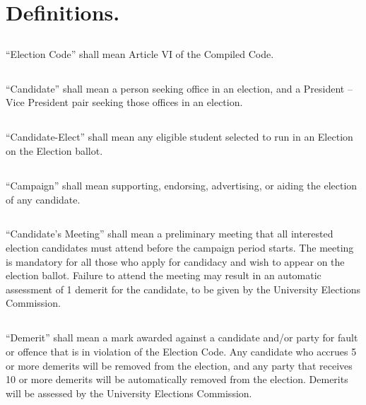
\section{Definitions.}

\subsection{}
``Election Code'' shall mean Article VI of the Compiled Code.

\subsection{}
``Candidate'' shall mean a person seeking office in an election, and a President -- Vice President pair seeking those offices in an election.

\subsection{}
``Candidate-Elect'' shall mean any eligible student selected to run in an Election on the Election ballot.

\subsection{}
``Campaign'' shall mean supporting, endorsing, advertising, or aiding the election of any candidate.

\subsection{}
``Candidate's Meeting'' shall mean a preliminary meeting that all interested election candidates must attend before the campaign period starts. The meeting is mandatory for all those who apply for candidacy and wish to appear on the election ballot. Failure to attend the meeting may result in an automatic assessment of 1 demerit for the candidate, to be given by the University Elections Commission.

\subsection{}
``Demerit'' shall mean a mark awarded against a candidate and/or party for fault or offence  that is in violation of the Election Code. Any candidate who accrues 5 or more demerits will be removed from the election, and any party that receives 10 or more demerits will be automatically removed from the election. Demerits will be assessed by the University Elections Commission.

